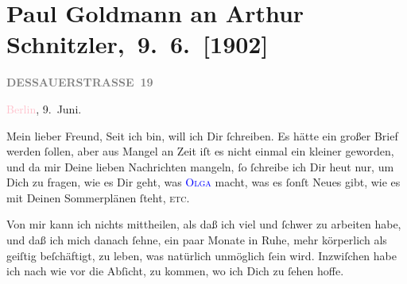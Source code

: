 

\renewcommand{\erwaehntePersonen}{Personen: Olga Schnitzler}
\renewcommand{\erwaehnteOrte}{Orte: Berlin, Dessauer Straße, Wien}
\renewcommand{\erwaehnteWerke}{}
\section[ Paul Goldmann an Arthur Schnitzler, 9. 6. {[}1902{]}]{Paul Goldmann an Arthur Schnitzler, 9. 6. {[}1902{]}}
\nopagebreak{}
\rehead{ }\normalsize\beginnumbering{}
\toendnotes[C]{\smallbreak\pagebreak[2]}
\toendnotes[C]{\smallbreak}
\pstart
           \noindent{}\raggedleft{}{\pb}\textcolor{pink}{\textcolor{gray}{\textbf{DESSAUERSTRASSE 19}}}{}\ledrightnote{\textcolor{pink}{Dessauer Straße}}\pend
           
\pstart
           \textcolor{pink}{Berlin}{}\ledrightnote{\textcolor{pink}{Berlin}}, 9. Juni.\pend
           
\pstart\center{}Mein lieber Freund,\pend
\pstart
           Seit ich \label{K_L03210-1v}\label{K_L03210-1h} bin, will ich Dir
               ſchreiben. Es hätte ein großer Brief werden ſollen, aber aus Mangel an Zeit iſt es
               nicht einmal ein kleiner geworden, und da mir Deine lieben Nachrichten mangeln, ſo
               ſchreibe ich Dir heut nur, um Dich zu fragen, wie es
               Dir geht, was \textsc{\textcolor{blue}{Olga}{}\ledrightnote{\textcolor{blue}{Olga Schnitzler}}} macht, was {\pb}es ſonſt Neues gibt, wie es mit
               Deinen Sommerplänen ſteht, \textsc{etc}. \pend
           
\pstart
           Von mir kann ich nichts mittheilen, als daß ich viel und ſchwer zu arbeiten habe, und
               daß ich mich danach ſehne, ein paar Monate in Ruhe, mehr körperlich als geiſtig
               beſchäftigt, zu leben, was natürlich unmöglich ſein wird. Inzwiſchen habe ich {\pb}nach wie vor die Abſicht, \label{K_L03210-2v}\label{K_L03210-2h} zu kommen, wo ich
               Dich zu ſehen hoffe.\pend
           

